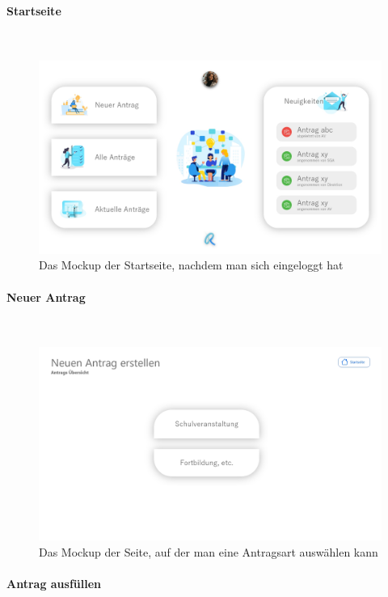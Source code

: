 \paragraph{Startseite}
~\\

\begin{figure}[H]
	\centering
	\includegraphics[width=1\linewidth]{images/Mockup-Startseite-eingeloggt}
	\caption[Mockup Startseite]{Das Mockup der Startseite, nachdem man sich eingeloggt hat}
	\label{fig:mockupStart}
\end{figure}
\paragraph{Neuer Antrag}
~\\

\begin{figure}[H]
	\centering
	\includegraphics[width=1\linewidth]{images/Mockup-Neuer-Antrag}
	\caption[Mockup neuer Antrag]{Das Mockup der Seite, auf der man eine Antragsart auswählen kann}
	\label{fig:mockupNeu}
\end{figure}
\paragraph{Antrag ausfüllen}
~\\

